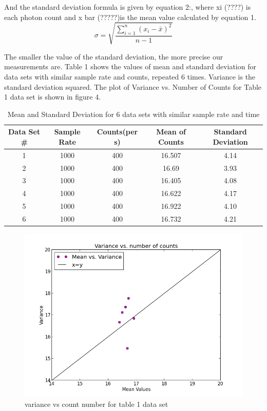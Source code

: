 \documentclass[letterpaper,12pt]{article}
\begin{document}
And the standard deviation formula is given by equation 2:, where xi   (????) is each photon count and x bar (?????)is the mean value calculated by equation 1. 
\begin{equation} \label{E:sd}
\sigma = \sqrt{\frac{\sum\limits_{i=1}^{n}
\left(x_{i} - \bar{x}\right)^{2}}
{n-1}}
\end{equation}

The smaller the value of the standard deviation, the more precise our measurements are. Table 1 shows the values of mean and standard deviation for data sets with similar sample rate and counts, repeated 6 times. Variance is the standard deviation squared. The plot of Variance vs. Number of Counts for Table 1 data set is shown in figure 4.

\begin{table}[ht]
\caption{Mean and Standard Deviation for 6 data sets with similar sample rate and time} %
\centering %
\begin{tabular}{c c c c c} %
\hline\hline %
Data Set \# & Sample Rate & Counts(per s) & Mean of Counts & Standard Deviation \\ [0.5ex] %
\hline %
1 & 1000 & 400 & 16.507 & 4.14\\ %
2 & 1000 & 400& 16.69  & 3.93\\
3 & 1000 & 400& 16.405  & 4.08\\
4 & 1000 & 400 & 16.622 & 4.17\\
5 & 1000 & 400 & 16.922 & 4.10\\ 
6 & 1000 & 400 & 16.732 & 4.21 \\ [1ex] %
\hline %
\end{tabular}
\label{table:nonlin} %
\end{table}


\begin{figure}
\centering
\includegraphics[scale=0.6]{variance-vs-count-number-400.png}
\caption{variance vs count number for table 1 data set}
\end{figure}
\end{document}
